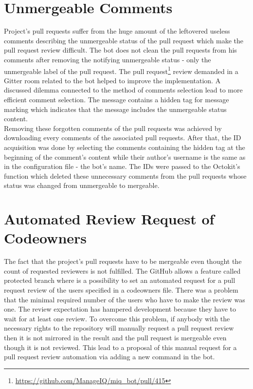 \section{Unmergeable Comments}

Project's pull requests suffer from the huge amount of the leftovered useless comments describing the unmergeable status of the pull request which make the pull request review difficult. The bot does not clean the pull requests from his comments after removing the notifying unmergeable status - only the unmergeable label of the pull request. The pull request\footnote{\url{https://github.com/ManageIQ/miq_bot/pull/415}} review demanded in a Gitter room related to the bot helped to improve the implementation. A discussed dilemma connected to the method of comments selection lead to more efficient comment selection. The message contains a hidden tag for message marking which indicates that the message includes the unmergeable status content.\\

Removing these forgotten comments of the pull requests was achieved by downloading every comments of the associated pull requests. After that, the ID acquisition was done by selecting the comments containing the hidden tag at the beginning of the comment's content while their author's username is the same as in the configuration file - the bot's name. The IDs were passed to the Octokit's function which deleted these unnecessary comments from the pull requests whose status was changed from unmergeable to mergeable.

\section{Automated Review Request of Codeowners}

The fact that the project's pull requests have to be mergeable even thought the count of requested reviewers is not fulfilled. The GitHub allows a feature called protected branch where is a possibility to set an automated request for a pull request review of the users specified in a codeowners file. There was a problem that the minimal required number of the users who have to make the review was one. The review expectation has hampered development because they have to wait for at least one review. To overcome this problem, if anybody with the necessary rights to the repository will manually request a pull request review then it is not mirrored in the result and the pull request is mergeable even though it is not reviewed. This lead to a proposal of this manual request for a pull request review automation via adding a new command in the bot.

